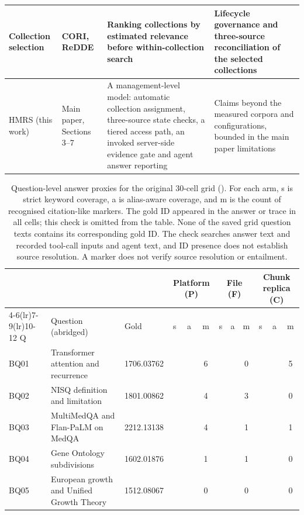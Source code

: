 \documentclass[final,5p,times,twocolumn]{elsarticle}
\newcommand{\yes}{\checkmark}\newcommand{\no}{--}
\begin{document}
\begin{table}[t]
\begin{tabular}{@{}>{\raggedright\arraybackslash}p{}>{\raggedright\arraybackslash}p{}>{\raggedright\arraybackslash}p{}>{\raggedright\arraybackslash}p{}@{}}
Collection selection & CORI, ReDDE & Ranking collections by estimated relevance before within-collection search & Lifecycle governance and three-source reconciliation of the selected collections\\
\midrule
HMRS (this work) & Main paper, Sections 3--7 & A management-level model: automatic collection assignment, three-source state checks, a tiered access path, an invoked server-side evidence gate and agent answer reporting & Claims beyond the measured corpora and configurations, bounded in the main paper limitations\\
\bottomrule
\end{tabular}
\end{table}

\begin{table}[t]
\centering
\small
\setlength{\tabcolsep}{3pt}
\caption{Question-level answer proxies for the original 30-cell grid
(\protect{}). For each arm, s is strict
keyword coverage, a is alias-aware coverage, and m is the count of
recognised citation-like markers. The gold ID appeared in the answer or
trace in all cells; this check is omitted from the table. None of the saved
grid question texts contains its corresponding gold ID. The check searches
answer text and recorded tool-call inputs and agent text, and ID presence
does not establish source resolution. A marker does not
verify source resolution or entailment.}
\label{tab:s-answer-grid}
\begin{tabular}{@{}l>{\raggedright\arraybackslash}p{}l*{9}{c}@{}}
\toprule
 & & & \multicolumn{3}{c}{Platform (P)} & \multicolumn{3}{c}{File (F)} & \multicolumn{3}{c}{Chunk replica (C)}\\
\cmidrule(lr){4-6}\cmidrule(lr){7-9}\cmidrule(lr){10-12}
Q & Question (abridged) & Gold & s & a & m & s & a & m & s & a & m\\
\midrule
BQ01 & Transformer attention and recurrence & 1706.03762 & \yes & \yes & 6 & \yes & \yes & 0 & \yes & \yes & 5\\
BQ02 & NISQ definition and limitation & 1801.00862 & \yes & \yes & 4 & \yes & \yes & 3 & \yes & \yes & 0\\
BQ03 & MultiMedQA and Flan-PaLM on MedQA & 2212.13138 & \yes & \yes & 4 & \yes & \yes & 1 & \yes & \yes & 1\\
BQ04 & Gene Ontology subdivisions & 1602.01876 & \yes & \yes & 1 & \yes & \yes & 1 & \yes & \yes & 0\\
BQ05 & European growth and Unified Growth Theory & 1512.08067 & \yes & \yes & 0 & \yes & \yes & 0 & \yes & \yes & 0\\

\end{tabular}
\end{table}
\end{document}

